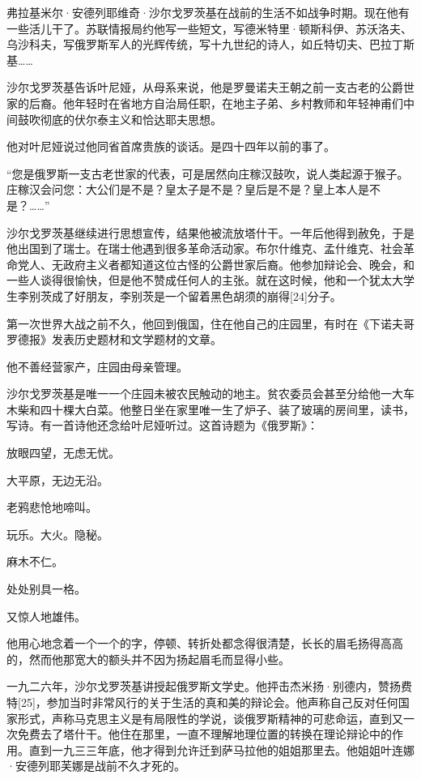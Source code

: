 弗拉基米尔·安德列耶维奇·沙尔戈罗茨基在战前的生活不如战争时期。现在他有一些活儿干了。苏联情报局约他写一些短文，写德米特里·顿斯科伊、苏沃洛夫、乌沙科夫，写俄罗斯军人的光辉传统，写十九世纪的诗人，如丘特切夫、巴拉丁斯基……

沙尔戈罗茨基告诉叶尼娅，从母系来说，他是罗曼诺夫王朝之前一支古老的公爵世家的后裔。他年轻时在省地方自治局任职，在地主子弟、乡村教师和年轻神甫们中间鼓吹彻底的伏尔泰主义和恰达耶夫思想。

他对叶尼娅说过他同省首席贵族的谈话。是四十四年以前的事了。

“您是俄罗斯一支古老世家的代表，可是居然向庄稼汉鼓吹，说人类起源于猴子。庄稼汉会问您：大公们是不是？皇太子是不是？皇后是不是？皇上本人是不是？……”

沙尔戈罗茨基继续进行思想宣传，结果他被流放塔什干。一年后他得到赦免，于是他出国到了瑞士。在瑞士他遇到很多革命活动家。布尔什维克、孟什维克、社会革命党人、无政府主义者都知道这位古怪的公爵世家后裔。他参加辩论会、晚会，和一些人谈得很愉快，但是他不赞成任何人的主张。就在这时候，他和一个犹太大学生李别茨成了好朋友，李别茨是一个留着黑色胡须的崩得[24]分子。

第一次世界大战之前不久，他回到俄国，住在他自己的庄园里，有时在《下诺夫哥罗德报》发表历史题材和文学题材的文章。

他不善经营家产，庄园由母亲管理。

沙尔戈罗茨基是唯一一个庄园未被农民触动的地主。贫农委员会甚至分给他一大车木柴和四十棵大白菜。他整日坐在家里唯一生了炉子、装了玻璃的房间里，读书，写诗。有一首诗他还念给叶尼娅听过。这首诗题为《俄罗斯》：

放眼四望，无虑无忧。

大平原，无边无沿。

老鸦悲怆地啼叫。

玩乐。大火。隐秘。

麻木不仁。

处处别具一格。

又惊人地雄伟。

他用心地念着一个一个的字，停顿、转折处都念得很清楚，长长的眉毛扬得高高的，然而他那宽大的额头并不因为扬起眉毛而显得小些。

一九二六年，沙尔戈罗茨基讲授起俄罗斯文学史。他抨击杰米扬·别德内，赞扬费特[25]，参加当时非常风行的关于生活的真和美的辩论会。他声称自己反对任何国家形式，声称马克思主义是有局限性的学说，谈俄罗斯精神的可悲命运，直到又一次免费去了塔什干。他住在那里，一直不理解地理位置的转换在理论辩论中的作用。直到一九三三年底，他才得到允许迁到萨马拉他的姐姐那里去。他姐姐叶连娜·安德列耶芙娜是战前不久才死的。

